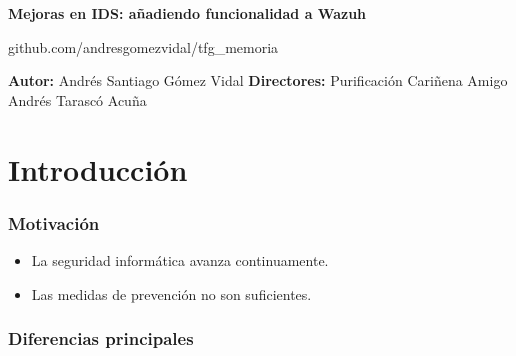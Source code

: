 \documentclass[a4paper,10pt]{beamer}
\newcommand{\linej}{\hfill\break}
\begin{document}
\begin{frame}[fragile]
	\linej
	\linej
	\linej
	\large
	\centerline{\textbf{Mejoras en IDS: añadiendo funcionalidad a Wazuh}}
	\normalsize
	\linej
	\linej
	\centerline{github.com/andresgomezvidal/tfg\_memoria}
	\linej
	\linej
	\begin{multicols}{2}
	\textbf{Autor:}
	\linej
		Andrés Santiago Gómez Vidal
	\linej
	\columnbreak
	\linej
	\textbf{Directores:}
	\linej
		Purificación Cariñena Amigo
	\linej
		Andrés Tarascó Acuña
	\end{multicols}

\end{frame}


\section{Introducción}
\begin{frame}[fragile]
	\frametitle{Motivación}

	\begin{itemize}
		\item La seguridad informática avanza continuamente. %
		\item Las medidas de prevención no son suficientes. %
	\end{itemize}
\end{frame}

\begin{frame}[fragile]
	\frametitle{Diferencias principales}
\end{frame}
\end{document}
